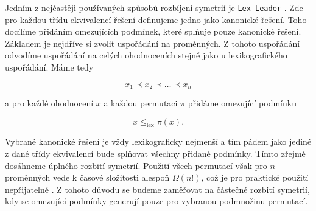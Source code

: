 Jedním z nejčastěji používaných způsobů rozbíjení symetrií je \texttt{Lex-Leader} \cite{DBLP:reference/fai/GentPP06}\cite{Rossi2014-gr}. Zde pro každou třídu ekvivalencí řešení definujeme jedno jako kanonické řešení. Toho docílíme přidáním omezujících podmínek, které splňuje pouze kanonické řešení. Základem je nejdříve si zvolit uspořádání na proměnných. Z tohoto uspořádání odvodíme uspořádání na celých ohodnoceních stejně jako u lexikografického uspořádání. Máme tedy

$$x_1 \prec x_2 \prec \dots \prec x_n$$

a pro každé ohodnocení $x$ a každou permutaci $\pi$ přidáme omezující podmínku 

$$x \leq_{\text{lex}} \pi(x).$$

Vybrané kanonické řešení je vždy lexikograficky nejmenší a tím pádem jako jediné z dané třídy ekvivalencí bude splňovat všechny přidané podmínky. Tímto zřejmě dosáhneme úplného rozbití symetrií. Použití všech permutací však pro $n$ proměnných vede k časové složitosti alespoň $\Omega(n!)$, což je pro praktické použití nepřijatelné \cite{DBLP:reference/fai/GentPP06}. Z tohoto důvodu se budeme zaměřovat na částečné rozbití symetrií, kdy se omezující podmínky generují pouze pro vybranou podmnožinu permutací.